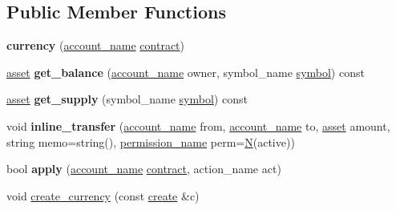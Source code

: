 \subsection*{Public Member Functions}
\begin{DoxyCompactItemize}
\item 
\mbox{\label{classaacio_1_1currency_aa76d68492d4362cdaea4acef90927b12}} 
{\bfseries currency} (\mbox{\hyperlink{structaacio_1_1chain_1_1name}{account\+\_\+name}} \mbox{\hyperlink{structaacio_1_1contract}{contract}})
\item 
\mbox{\label{classaacio_1_1currency_aa189880aadb94527c21af0786a123b78}} 
\mbox{\hyperlink{structaacio_1_1asset}{asset}} {\bfseries get\+\_\+balance} (\mbox{\hyperlink{structaacio_1_1chain_1_1name}{account\+\_\+name}} owner, symbol\+\_\+name \mbox{\hyperlink{classaacio_1_1chain_1_1symbol}{symbol}}) const
\item 
\mbox{\label{classaacio_1_1currency_ac8cba3f27e5022f5bf96f68636497e38}} 
\mbox{\hyperlink{structaacio_1_1asset}{asset}} {\bfseries get\+\_\+supply} (symbol\+\_\+name \mbox{\hyperlink{classaacio_1_1chain_1_1symbol}{symbol}}) const
\item 
\mbox{\label{classaacio_1_1currency_a4282456a4c56e49f60e220272082106a}} 
void {\bfseries inline\+\_\+transfer} (\mbox{\hyperlink{structaacio_1_1chain_1_1name}{account\+\_\+name}} from, \mbox{\hyperlink{structaacio_1_1chain_1_1name}{account\+\_\+name}} to, \mbox{\hyperlink{structaacio_1_1asset}{asset}} amount, string memo=string(), \mbox{\hyperlink{structaacio_1_1chain_1_1name}{permission\+\_\+name}} perm=\mbox{\hyperlink{group__types_gaf9c1edb0e0da55ec6ba09f32f6839529}{N}}(active))
\item 
\mbox{\label{classaacio_1_1currency_af1d738680c73bec5d2e7b7e2289b9fe3}} 
bool {\bfseries apply} (\mbox{\hyperlink{structaacio_1_1chain_1_1name}{account\+\_\+name}} \mbox{\hyperlink{structaacio_1_1contract}{contract}}, action\+\_\+name act)
\item 
void \mbox{\hyperlink{classaacio_1_1currency_a7a7b9ea7a4124b4dc21bd57f383042a5}{create\+\_\+currency}} (const \mbox{\hyperlink{structaacio_1_1currency_1_1create}{create}} \&c)
\item 
\mbox{\label{classaacio_1_1currency_ad4fe84cd9d9f590eb6ad5bc9d983372e}} 

\end{DoxyCompactItemize}
